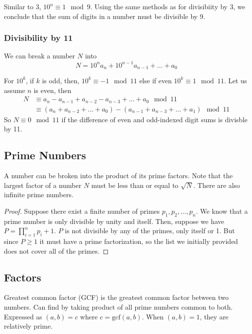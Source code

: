 Similar to 3, $10^n\equiv 1 \mod 9$. Using the same methods as for divisibiity by 3,
we conclude that the sum of digits in a number must be divisible by 9.

\subsubsection{Divisibility by 11}

We can break a number $N$ into
\begin{equation*}
    N=10^na_n + 10^{n-1}a_{n-1} + \ldots + a_0
\end{equation*}

For $10^k$, if $k$ is odd, then, $10^k\equiv -1\mod 11$ else if even $10^k\equiv 1\mod 11$.
Let us assume $n$ is even, then
\begin{align*}
    N&\equiv a_n-a_{n-1}+a_{n-2}-a_{n-3}+\ldots+a_0\mod 11\\
    &\equiv (a_n+a_{n-2}+\ldots+a_0)-(a_{n-1}+a_{n-3}+\ldots+a_1)\mod 11
\end{align*}
So $N\equiv 0\mod 11$ if the difference of even and odd-indexed digit sums is divisble by 11.

\subsection{Prime Numbers}

A number can be broken into the product of its prime factors.
Note that the largest factor of a number $N$ must be less than or equal to $\sqrt{N}$.
There are also infinite prime numbers.

\begin{proof}
    Suppose there exist a finite number of primes $p_1,p_2,\ldots,p_n$.
    We know that a prime number is only divisible by unity and itself.
    Then, suppose we have $P=\prod_{i=1}^n p_i + 1$. $P$ is not divisible by any of the primes,
    only itself or 1. But since $P\geq 1$ it must have a prime factorization, so the list we initially provided does not cover all of the primes.
\end{proof}

\subsection{Factors}

Greatest common factor (GCF) is the greatest common factor between two numbers.
Can find by taking product of all prime numbers common to both. Expressed as $(a,b)=c$ where $c=\mathrm{gcf}(a,b)$.
When $(a,b)=1$, they are relatively prime.

